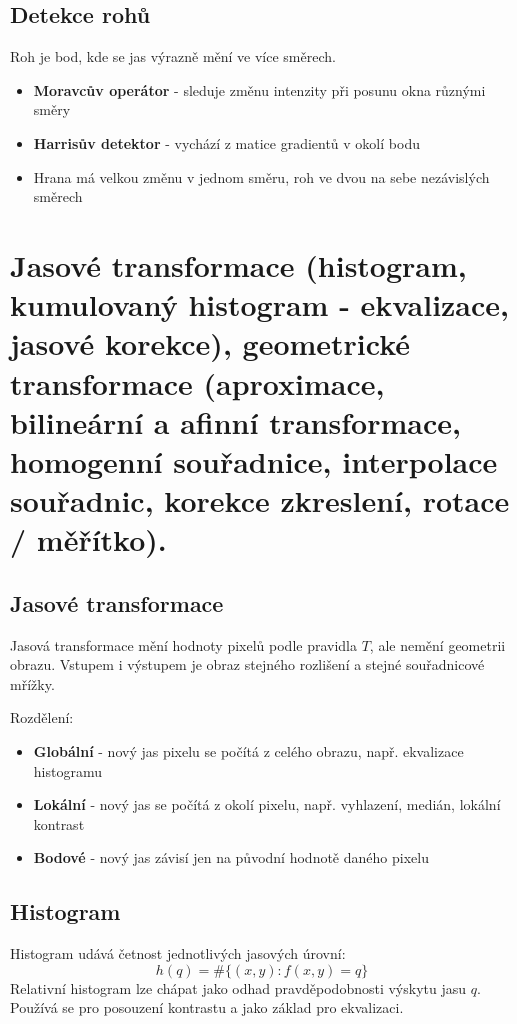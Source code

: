 \subsection*{Detekce rohů}
Roh je bod, kde se jas výrazně mění ve více směrech.
\begin{itemize}
    \item \textbf{Moravcův operátor} - sleduje změnu intenzity při posunu okna různými směry
    \item \textbf{Harrisův detektor} - vychází z matice gradientů v okolí bodu
    \item Hrana má velkou změnu v jednom směru, roh ve dvou na sebe nezávislých směrech
\end{itemize}

\newpage

\section{Jasové transformace (histogram, kumulovaný histogram - ekvalizace, jasové korekce), geometrické transformace
(aproximace, bilineární a afinní transformace, homogenní souřadnice, interpolace souřadnic, korekce zkreslení, rotace /
měřítko).}

\subsection*{Jasové transformace}
Jasová transformace mění hodnoty pixelů podle pravidla \(T\), ale nemění geometrii obrazu.
Vstupem i výstupem je obraz stejného rozlišení a stejné souřadnicové mřížky.

Rozdělení:
\begin{itemize}
    \item \textbf{Globální} - nový jas pixelu se počítá z celého obrazu, např. ekvalizace histogramu
    \item \textbf{Lokální} - nový jas se počítá z okolí pixelu, např. vyhlazení, medián, lokální kontrast
    \item \textbf{Bodové} - nový jas závisí jen na původní hodnotě daného pixelu
\end{itemize}

\subsection*{Histogram}
Histogram udává četnost jednotlivých jasových úrovní:
\begin{equation}
    h(q)=\#\{(x,y): f(x,y)=q\}
\end{equation}
Relativní histogram lze chápat jako odhad pravděpodobnosti výskytu jasu \(q\).
Používá se pro posouzení kontrastu a jako základ pro ekvalizaci.

